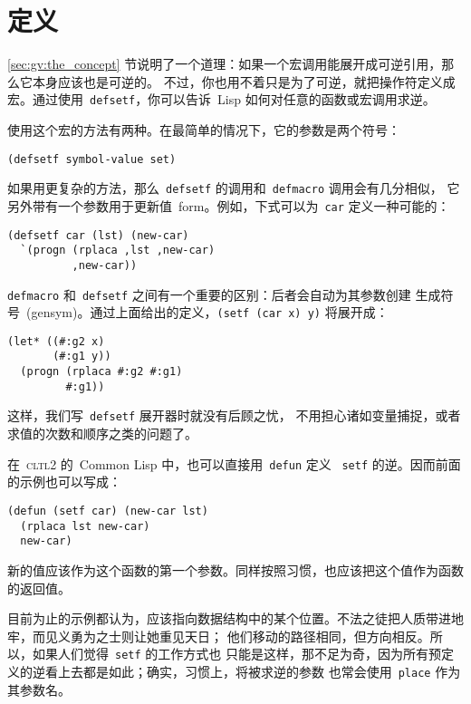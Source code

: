 \section{定义\inversion}
\label{sec:defining_inversions}

\ref{sec:gv:the_concept} 节说明了一个道理：如果一个宏调用能展开成可逆引用，那么它本身应该也是可逆的。
不过，你也用不着只是为了可逆，就把操作符定义成宏。通过使用~\verb|defsetf|，你可以告诉~Lisp
如何对任意的函数或宏调用求逆。

使用这个宏的方法有两种。在最简单的情况下，它的参数是两个符号：
\begin{lstlisting}
(defsetf symbol-value set)
\end{lstlisting}
如果用更复杂的方法，那么~\verb|defsetf| 的调用和~\verb|defmacro| 调用会有几分相似，
它另外带有一个参数用于更新值~form。例如，下式可以为~\verb|car| 定义一种可能的\inversion：
\begin{lstlisting}
(defsetf car (lst) (new-car)
  `(progn (rplaca ,lst ,new-car)
          ,new-car))
\end{lstlisting}
\verb|defmacro| 和~\verb|defsetf| 之间有一个重要的区别：后者会自动为其参数创建
生成符号~(gensym)。通过上面给出的定义，\verb|(setf (car x) y)| 将展开成：
\begin{lstlisting}
(let* ((#:g2 x)
       (#:g1 y))
  (progn (rplaca #:g2 #:g1)
         #:g1))
\end{lstlisting}
这样，我们写~\verb|defsetf| 展开器时就没有后顾之忧，
不用担心诸如变量捕捉，或者求值的次数和顺序之类的问题了。

在~\textsc{cltl}2 的~Common Lisp 中，也可以直接用~\verb|defun| 定义
~\verb|setf| 的逆。因而前面的示例也可以写成：
\begin{lstlisting}
(defun (setf car) (new-car lst)
  (rplaca lst new-car)
  new-car)
\end{lstlisting}
新的值应该作为这个函数的第一个参数。同样按照习惯，也应该把这个值作为函数的返回值。

目前为止的示例都认为，\gv{}应该指向数据结构中的某个位置。不法之徒把人质带进地牢，而见义勇为之士则让她重见天日；
他们移动的路径相同，但方向相反。所以，如果人们觉得~\verb|setf| 的工作方式也
只能是这样，那不足为奇，因为所有预定义的逆看上去都是如此；确实，习惯上，将被求逆的参数
也常会使用~\verb|place| 作为其参数名。

